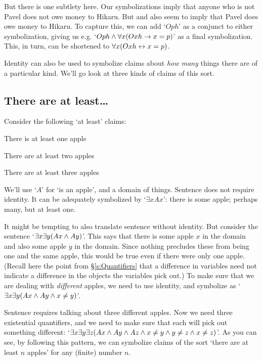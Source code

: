 But there is one subtlety here.   Our symbolizations imply that anyone who is not Pavel does not owe money to Hikaru.  But  and  also seem to imply that Pavel does owe money to Hikaru.  To capture this, we can add `$Oph$' as a conjunct to either symbolization, giving us e.g. `$Oph \wedge \forall x (Oxh \rightarrow x = p)$' as a final symbolization. This, in turn, can be shortened to $\forall x(Oxh \leftrightarrow x=p)$.


Identity can also be used to symbolize claims about \emph{how many} things there are of a particular kind.  We'll go look at three kinds of claims of this sort.

\subsection{There are at least\ldots}
Consider the following `at least' claims:
\begin{earg}
\item[\ex{atleast1}] There is at least one apple
\item[\ex{atleast2}] There are at least two apples
\item[\ex{atleast3}] There are at least three apples
\end{earg}
We'll use `$A$' for `\blank is an apple', and a domain of things.  Sentence  does not require identity. It can be adequately symbolized by `$\exists x Ax$': there is some apple; perhaps many, but at least one.

It might be tempting to also translate sentence  without identity. But consider the sentence `$\exists x \exists y(Ax \wedge Ay)$'. This says that there is some apple $x$ in the domain and also some apple $y$ in the domain. Since nothing precludes these from being one and the same apple, this would be true even if there were only one apple.  (Recall here the point from \S\ref{s:Quantifiers} that a difference in variables need not indicate a difference in the objects the variables pick out.) To make sure that we are dealing with \emph{different} apples, we need to use identity, and symbolize  as  `$\exists x \exists y(Ax \wedge Ay \wedge x \neq y)$'.

Sentence  requires talking about three different apples. Now we need three existential quantifiers, and we need to make sure that each will pick out something different: `$\exists x \exists y\exists z(Ax \wedge Ay \wedge Az \wedge x \neq y \wedge y \neq z \wedge x \neq z)$'.  As you can see, by following this pattern, we can symbolize claims of the sort `there are at least $n$ apples' for any (finite) number $n$.

